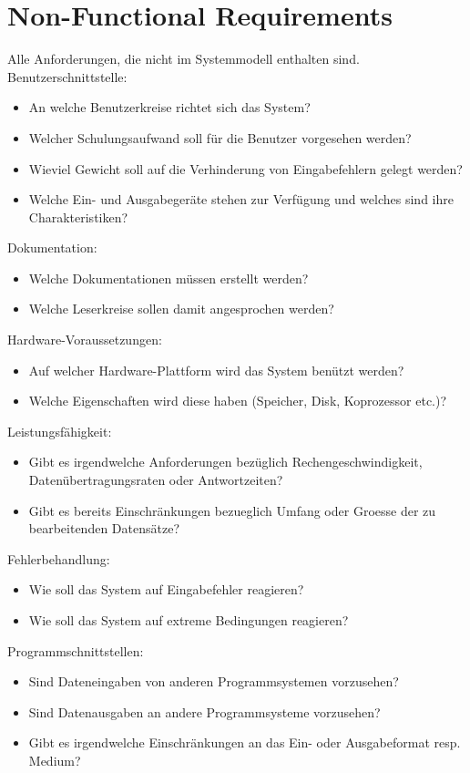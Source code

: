 \section{Non-Functional Requirements}
Alle Anforderungen, die nicht im Systemmodell enthalten sind.\\[2ex]
Benutzerschnittstelle:
\begin{itemize}
\item An welche Benutzerkreise richtet sich das System?
\item Welcher Schulungsaufwand soll f\"ur die Benutzer vorgesehen werden?
\item Wieviel Gewicht soll auf die Verhinderung von Eingabefehlern
 gelegt werden?
\item Welche Ein- und Ausgabeger\"ate stehen zur Verf\"ugung und welches
  sind ihre Charakteristiken?
\end{itemize}
Dokumentation:
\begin{itemize}
\item Welche Dokumentationen m\"ussen erstellt werden?
\item Welche Leserkreise sollen damit angesprochen werden?
\end{itemize}
Hardware-Voraussetzungen:
\begin{itemize}
\item Auf welcher Hardware-Plattform wird das System ben\"utzt werden?
\item Welche Eigenschaften wird diese haben (Speicher, Disk, 
        Koprozessor etc.)?
\end{itemize}
Leistungsf\"ahigkeit:
\begin{itemize}
\item Gibt es irgendwelche Anforderungen bez\"uglich Rechengeschwindigkeit,
 Daten\-\"ubertragungsraten oder Antwortzeiten?
\item Gibt es bereits Einschr\"ankungen bezueglich Umfang oder Groesse der
 zu bearbeitenden Datens\"atze?
\end{itemize}
Fehlerbehandlung:
\begin{itemize}
\item Wie soll das System auf Eingabefehler reagieren?
\item Wie soll das System auf extreme Bedingungen reagieren?
\end{itemize}
\ifslides
\newpage
\fi
Programmschnittstellen:
\begin{itemize}
\item Sind Dateneingaben von anderen Programmsystemen vorzusehen?
\item Sind Datenausgaben an andere Programmsysteme vorzusehen?
\item Gibt es irgendwelche Einschr\"ankungen an das Ein- oder Ausgabeformat
resp. Medium?
\end{itemize}
